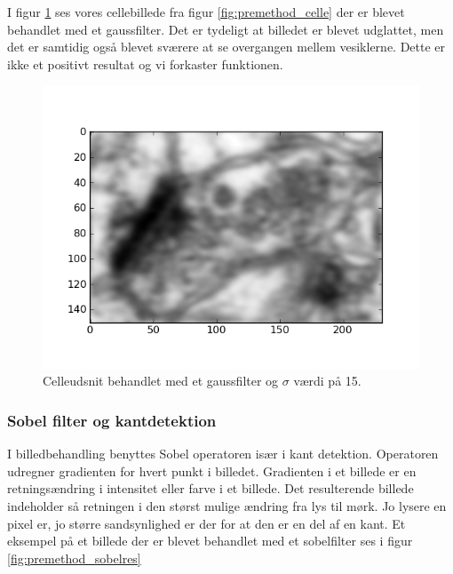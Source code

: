 I figur \ref{fig:premethod_GaussCelle} ses vores cellebillede fra figur \ref{fig:premethod_celle} der er blevet behandlet med et gaussfilter. Det er tydeligt at billedet er blevet udglattet, men det er samtidig også blevet sværere at se overgangen mellem vesiklerne. Dette er ikke et positivt resultat og vi forkaster funktionen.

\begin{figure}[H]
	\centering
	\includegraphics[scale=0.8]{files/premethod/img/gausscell.png}
	\caption{Celleudsnit behandlet med et gaussfilter og $\sigma$ værdi på 15.\label{fig:premethod_GaussCelle}}
\end{figure}


\subsubsection{Sobel filter og kantdetektion}
I billedbehandling benyttes Sobel operatoren især i kant detektion. Operatoren udregner gradienten for hvert punkt i billedet. Gradienten i et billede er en retningsændring i intensitet eller farve i et billede. Det resulterende billede indeholder så retningen i den størst mulige ændring fra lys til mørk. Jo lysere en pixel er, jo større sandsynlighed er der for at den er en del af en kant. Et eksempel på et billede der er blevet behandlet med et sobelfilter ses i figur \ref{fig:premethod_sobelres}

